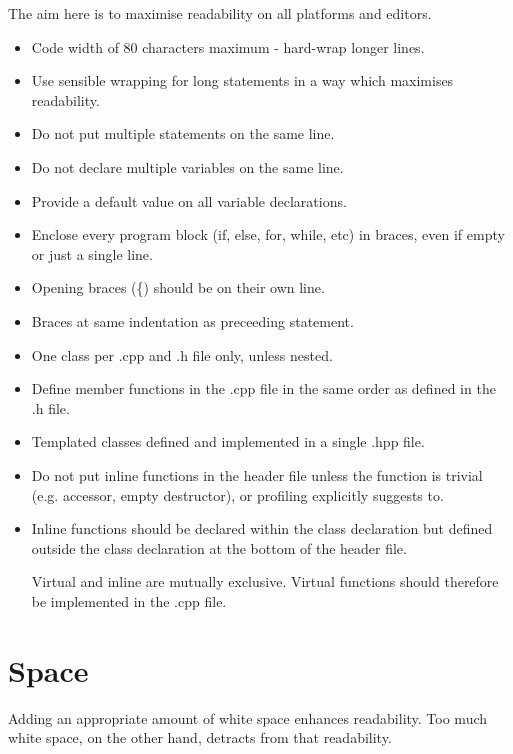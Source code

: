 The aim here is to maximise readability on all platforms and editors.
\begin{itemize}
\item Code width of 80 characters maximum - hard-wrap longer lines.
\item Use sensible wrapping for long statements in a way which maximises
readability.
\item Do not put multiple statements on the same line.
\item Do not declare multiple variables on the same line.
\item Provide a default value on all variable declarations.
\item Enclose every program block (if, else, for, while, etc) in braces, even if
empty or just a single line.
\item Opening braces (\{) should be on their own line.
\item Braces at same indentation as preceeding statement.
\item One class per .cpp and .h file only, unless nested.
\item Define member functions in the .cpp file in the same order as defined in
the .h file.
\item Templated classes defined and implemented in a single .hpp file.
\item Do not put inline functions in the header file unless the function is
trivial (e.g. accessor, empty destructor), or profiling explicitly suggests to.
\item Inline functions should be declared within the class declaration but
defined outside the class declaration at the bottom of the header file.
\begin{notebox}
Virtual and inline are mutually exclusive. Virtual functions should therefore be
implemented in the .cpp file.
\end{notebox}
\end{itemize}


\section{Space}

Adding an appropriate amount of white space enhances readability. Too much white
space, on the other hand, detracts from that readability.

